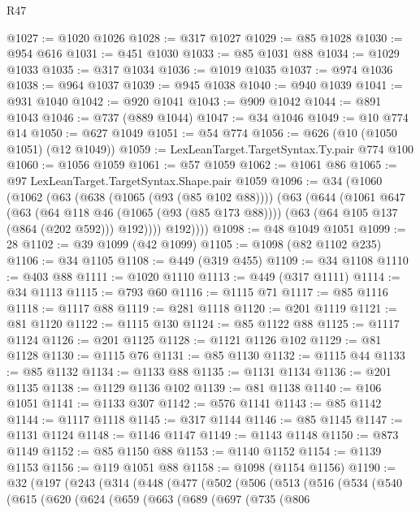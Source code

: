\begin{lexlean}{R47}
\begin{coremodule}
@1027 := @1020 @1026
@1028 := @317 @1027
@1029 := @85 @1028
@1030 := @954 @616
@1031 := @451 @1030
@1033 := @85 @1031 @88
@1034 := @1029 @1033
@1035 := @317 @1034
@1036 := @1019 @1035
@1037 := @974 @1036
@1038 := @964 @1037
@1039 := @945 @1038
@1040 := @940 @1039
@1041 := @931 @1040
@1042 := @920 @1041
@1043 := @909 @1042
@1044 := @891 @1043
@1046 := @737 (@889 @1044)
@1047 := @34 @1046
@1049 := @10 @774 @14
@1050 := @627 @1049
@1051 := @54 @774
@1056 := @626 (@10 (@1050 @1051) (@12 @1049))
@1059 := LexLeanTarget.TargetSyntax.Ty.pair @774 @100
@1060 := @1056 @1059
@1061 := @57 @1059
@1062 := @1061 @86
@1065 := @97 LexLeanTarget.TargetSyntax.Shape.pair @1059
@1096 := @34
    (@1060
      (@1062
        (@63
          (@638 (@1065 (@93 (@85 @102 @88))))
          (@63
            (@644
              (@1061
                @647
                (@63
                  (@64 @118 @46 (@1065 (@93 (@85 @173 @88))))
                  (@63 (@64 @105 @137 (@864 (@202 @592))) @192))))
            @192))))
@1098 := @48 @1049 @1051
@1099 := 28
@1102 := @39 @1099 (@42 @1099)
@1105 := @1098 (@82 @1102 @235)
@1106 := @34 @1105
@1108 := @449 (@319 @455)
@1109 := @34 @1108
@1110 := @403 @88
@1111 := @1020 @1110
@1113 := @449 (@317 @1111)
@1114 := @34 @1113
@1115 := @793 @60
@1116 := @1115 @71
@1117 := @85 @1116
@1118 := @1117 @88
@1119 := @281 @1118
@1120 := @201 @1119
@1121 := @81 @1120
@1122 := @1115 @130
@1124 := @85 @1122 @88
@1125 := @1117 @1124
@1126 := @201 @1125
@1128 := @1121 @1126 @102
@1129 := @81 @1128
@1130 := @1115 @76
@1131 := @85 @1130
@1132 := @1115 @44
@1133 := @85 @1132
@1134 := @1133 @88
@1135 := @1131 @1134
@1136 := @201 @1135
@1138 := @1129 @1136 @102
@1139 := @81 @1138
@1140 := @106 @1051
@1141 := @1133 @307
@1142 := @576 @1141
@1143 := @85 @1142
@1144 := @1117 @1118
@1145 := @317 @1144
@1146 := @85 @1145
@1147 := @1131 @1124
@1148 := @1146 @1147
@1149 := @1143 @1148
@1150 := @873 @1149
@1152 := @85 @1150 @88
@1153 := @1140 @1152
@1154 := @1139 @1153
@1156 := @119 @1051 @88
@1158 := @1098 (@1154 @1156)
@1190 := @32
    (@197
      (@243
        (@314
          (@448
            (@477
              (@502
                (@506
                  (@513
                    (@516
                      (@534
                        (@540
                          (@615
                            (@620
                              (@624
                                (@659
                                  (@663
                                    (@689
                                      (@697
                                        (@735
                                          (@806

\end{coremodule}
\end{lexlean}
